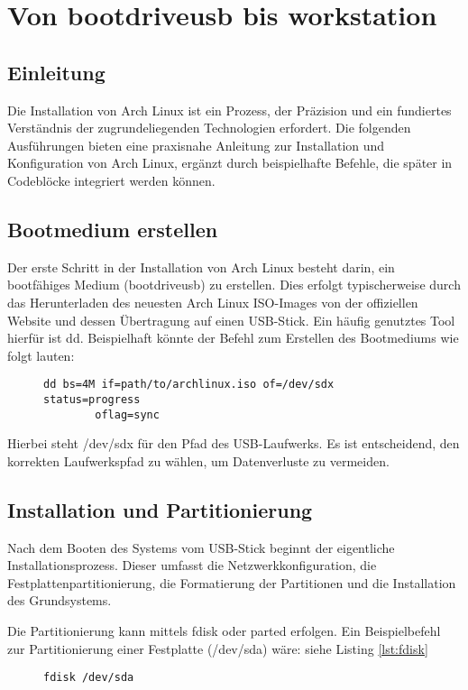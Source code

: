 \section{Von \gls{bootdriveusb} bis \gls{workstation}}
\subsection{Einleitung}

Die Installation von Arch Linux ist ein Prozess, der Präzision und ein
fundiertes Verständnis der zugrundeliegenden Technologien erfordert. Die
folgenden Ausführungen bieten eine praxisnahe Anleitung zur Installation und
Konfiguration von Arch Linux, ergänzt durch beispielhafte Befehle, die später in
Codeblöcke integriert werden können.

\subsection{Bootmedium erstellen}

Der erste Schritt in der Installation von Arch Linux besteht darin, ein
bootfähiges Medium (\gls{bootdriveusb}) zu erstellen. Dies erfolgt typischerweise durch das
Herunterladen des neuesten Arch Linux ISO-Images von der offiziellen Website und
dessen Übertragung auf einen USB-Stick. Ein häufig genutztes Tool hierfür ist dd.
Beispielhaft könnte der Befehl zum Erstellen des Bootmediums wie folgt lauten:

\begin{figure}[bht]
    \begin{lstlisting}[caption={Command für \gls{bash}}]
       dd bs=4M if=path/to/archlinux.iso of=/dev/sdx status=progress
        oflag=sync 
    \end{lstlisting}
\end{figure}
Hierbei steht /dev/sdx für den Pfad des USB-Laufwerks. Es ist entscheidend, den
korrekten Laufwerkspfad zu wählen, um Datenverluste zu vermeiden.

\subsection{Installation und Partitionierung}

Nach dem Booten des Systems vom USB-Stick beginnt der eigentliche
Installationsprozess. Dieser umfasst die Netzwerkkonfiguration, die
Festplattenpartitionierung, die Formatierung der Partitionen und die
Installation des Grundsystems.

Die Partitionierung kann mittels fdisk oder parted erfolgen. Ein Beispielbefehl
zur Partitionierung einer Festplatte (/dev/sda) wäre: siehe Listing \ref{lst:fdisk}
\newpage
\begin{figure}[bht]
    \begin{lstlisting}[caption={Command für \gls{bash}}, label=lst:fdisk]
        fdisk /dev/sda
    \end{lstlisting}
\end{figure}